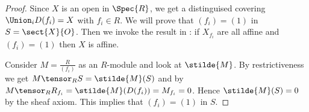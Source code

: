 \begin{proof}
Since $X$ is an open in $\Spec{R}$, 
we get a distinguised covering $\Union_i D(f_i) = X$ with $f_i\in R$.
We will prove that $(f_i) = (1)$ in $S = \sect{X}{O}$.
Then we invoke the result in \cite[Ex. 2.1.7]{harts}: if $X_{f_i}$ are all affine and $(f_i)=(1)$ then $X$ is affine. 

Consider $M = \frac{R}{(f_i)}$ as an $R$-module and look at $\stilde{M}$.
By restrictiveness we get $M \tensor_R S = \stilde{M}(S)$ and  
by $M \tensor_R R_{f_i} = \stilde{M}(D(f_i)) = M_{f_i} = 0$. 
Hence $\stilde{M}(S) = 0$ by the sheaf axiom.
This implies that $(f_i) = (1)$ in $S$.
\end{proof}
